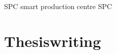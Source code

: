 %
%
%
%

%
%

SPC smart production centre
SPC 

\cleardoublepage
\part{Thesiswriting}
\cleardoublepage